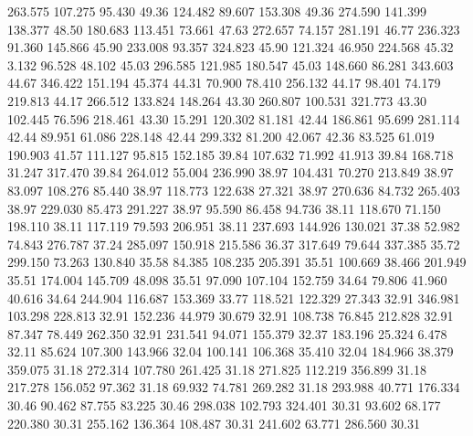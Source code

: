  263.575  107.275   95.430        49.36
 124.482   89.607  153.308        49.36
 274.590  141.399  138.377        48.50
 180.683  113.451   73.661        47.63
 272.657   74.157  281.191        46.77
 236.323   91.360  145.866        45.90
 233.008   93.357  324.823        45.90
 121.324   46.950  224.568        45.32
   3.132   96.528   48.102        45.03
 296.585  121.985  180.547        45.03
 148.660   86.281  343.603        44.67
 346.422  151.194   45.374        44.31
  70.900   78.410  256.132        44.17
  98.401   74.179  219.813        44.17
 266.512  133.824  148.264        43.30
 260.807  100.531  321.773        43.30
 102.445   76.596  218.461        43.30
  15.291  120.302   81.181        42.44
 186.861   95.699  281.114        42.44
  89.951   61.086  228.148        42.44
 299.332   81.200   42.067        42.36
  83.525   61.019  190.903        41.57
 111.127   95.815  152.185        39.84
 107.632   71.992   41.913        39.84
 168.718   31.247  317.470        39.84
 264.012   55.004  236.990        38.97
 104.431   70.270  213.849        38.97
  83.097  108.276   85.440        38.97
 118.773  122.638   27.321        38.97
 270.636   84.732  265.403        38.97
 229.030   85.473  291.227        38.97
  95.590   86.458   94.736        38.11
 118.670   71.150  198.110        38.11
 117.119   79.593  206.951        38.11
 237.693  144.926  130.021        37.38
  52.982   74.843  276.787        37.24
 285.097  150.918  215.586        36.37
 317.649   79.644  337.385        35.72
 299.150   73.263  130.840        35.58
  84.385  108.235  205.391        35.51
 100.669   38.466  201.949        35.51
 174.004  145.709   48.098        35.51
  97.090  107.104  152.759        34.64
  79.806   41.960   40.616        34.64
 244.904  116.687  153.369        33.77
 118.521  122.329   27.343        32.91
 346.981  103.298  228.813        32.91
 152.236   44.979   30.679        32.91
 108.738   76.845  212.828        32.91
  87.347   78.449  262.350        32.91
 231.541   94.071  155.379        32.37
 183.196   25.324    6.478        32.11
  85.624  107.300  143.966        32.04
 100.141  106.368   35.410        32.04
 184.966   38.379  359.075        31.18
 272.314  107.780  261.425        31.18
 271.825  112.219  356.899        31.18
 217.278  156.052   97.362        31.18
  69.932   74.781  269.282        31.18
 293.988   40.771  176.334        30.46
  90.462   87.755   83.225        30.46
 298.038  102.793  324.401        30.31
  93.602   68.177  220.380        30.31
 255.162  136.364  108.487        30.31
 241.602   63.771  286.560        30.31
